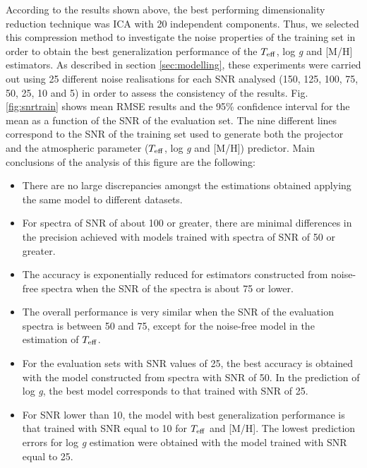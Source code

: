 \documentclass[a4paper,fleqn,usenatbib]{mnras}
\begin{document}
{{{%

According to the results shown above, the best performing
dimensionality reduction technique was ICA with 20 independent
components. Thus, we selected
this compression method to investigate the noise properties of
  the training set in order to obtain the best generalization
performance of the $T_{\rm eff}$, log \textit{g} and [M/H]
estimators.  As described in section \ref{sec:modelling}, these
experiments were carried out using 25 different noise
  realisations for each SNR analysed (150, 125, 100, 75, 50, 25, 10
and 5) in order to assess the consistency of the results.  Fig.~
\ref{fig:snrtrain} shows mean RMSE results and the 95\% confidence
interval for the mean as a function of the SNR of the evaluation
set. The nine different lines correspond to the SNR of the
training set used to generate both the projector and the atmospheric 
parameter ($T_{\rm eff}$, log \textit{g} and [M/H]) predictor. 
Main conclusions of the analysis of this figure are the
following:

\begin{itemize}
\item There are no large discrepancies amongst the estimations 
	obtained applying the same model to different datasets.
\item For spectra of SNR of about 100 or greater, there are minimal
  differences in the precision achieved with models trained with
  spectra of SNR of 50 or greater.
\item The accuracy is exponentially reduced for estimators
  constructed from noise-free spectra when the SNR of the spectra is
  about 75 or lower.
\item The overall performance is very similar when the SNR of the
  evaluation spectra is between 50 and 75, except for the noise-free
  model in the estimation of $T_{\rm eff}$. 
\item For the evaluation sets with SNR values of 25, the best accuracy
  is obtained with the model constructed from spectra with SNR of 50. 
  In the prediction of log \textit{g}, the best model corresponds to 
  that trained with SNR of 25.
\item For SNR lower than 10, the model with best generalization
  performance is that trained with SNR equal to 10 for $T_{\rm eff}$ 
  and [M/H]. The lowest prediction errors for log \textit{g} estimation 
  were obtained with the model trained with SNR equal to 25.
\end{itemize}

}}}
\end{document}
